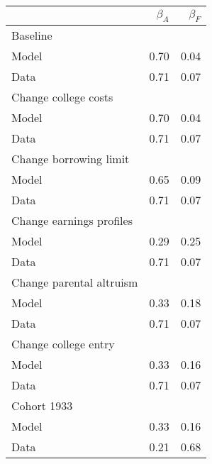 \begin{tabular}{lrr}
\hline
  & $\beta_{A}$  & $\beta_{F}$  \\ 
\hline
Baseline &   &   \\ 
Model & 0.70  & 0.04  \\ 
Data & 0.71  & 0.07  \\ 
Change college costs &   &   \\ 
Model & 0.70  & 0.04  \\ 
Data & 0.71  & 0.07  \\ 
Change borrowing limit &   &   \\ 
Model & 0.65  & 0.09  \\ 
Data & 0.71  & 0.07  \\ 
Change earnings profiles &   &   \\ 
Model & 0.29  & 0.25  \\ 
Data & 0.71  & 0.07  \\ 
Change parental altruism &   &   \\ 
Model & 0.33  & 0.18  \\ 
Data & 0.71  & 0.07  \\ 
Change college entry &   &   \\ 
Model & 0.33  & 0.16  \\ 
Data & 0.71  & 0.07  \\ 
Cohort 1933 &   &   \\ 
Model & 0.33  & 0.16  \\ 
Data & 0.21  & 0.68  \\ 
\hline
\end{tabular}%
